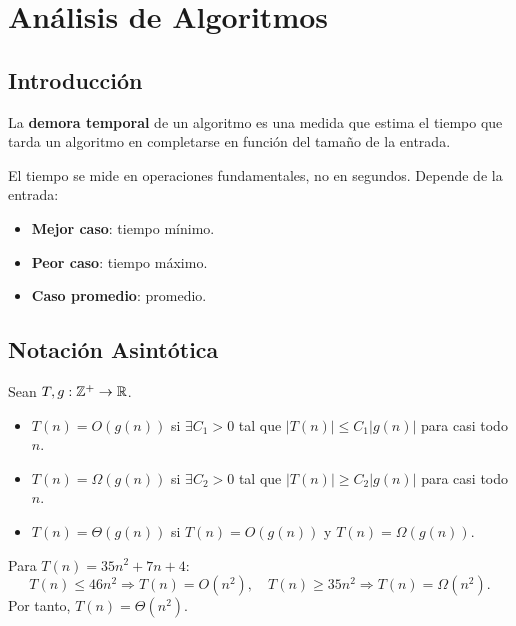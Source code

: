 \chapter{Análisis de Algoritmos}

\section{Introducción}

\begin{definicion}
La \textbf{demora temporal} de un algoritmo es una medida que estima el tiempo que tarda un algoritmo en completarse en función del tamaño de la entrada.
\end{definicion}

\begin{observacion}
El tiempo se mide en operaciones fundamentales, no en segundos. Depende de la entrada:
\begin{itemize}
  \item \textbf{Mejor caso}: tiempo mínimo.
  \item \textbf{Peor caso}: tiempo máximo.
  \item \textbf{Caso promedio}: promedio.
\end{itemize}
\end{observacion}

\section{Notación Asintótica}

\begin{definicion}
Sean $T, g: \mathbb{Z}^+ \to \mathbb{R}$.
\begin{itemize}
  \item $T(n) = O(g(n))$ si $\exists C_1 > 0$ tal que $|T(n)| \leq C_1 |g(n)|$ para casi todo $n$.
  \item $T(n) = \Omega(g(n))$ si $\exists C_2 > 0$ tal que $|T(n)| \geq C_2 |g(n)|$ para casi todo $n$.
  \item $T(n) = \Theta(g(n))$ si $T(n) = O(g(n))$ y $T(n) = \Omega(g(n))$.
\end{itemize}
\end{definicion}

\begin{ejemplo}
Para $T(n) = 35n^2 + 7n + 4$:
\[
T(n) \leq 46 n^2 \Rightarrow T(n) = O(n^2), \quad T(n) \geq 35 n^2 \Rightarrow T(n) = \Omega(n^2).
\]
Por tanto, $T(n) = \Theta(n^2)$.
\end{ejemplo}

